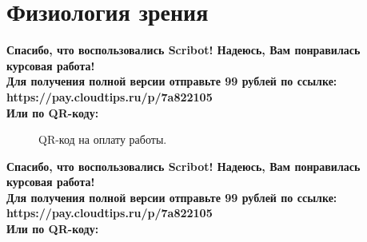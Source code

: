 \documentclass{article}
\begin{document}
\section{Физиология зрения}
\begin{center}
    \textbf{
        Спасибо, что воспользовались Scribot! Надеюсь, Вам понравилась курсовая работа!\\
        Для получения полной версии отправьте 99 рублей по ссылке:\\
        https://pay.cloudtips.ru/p/7a822105\\
        Или по QR-коду:\\
    }
\end{center}
\begin{figure}[h]
    \caption{QR-код на оплату работы.}
    \label{ris:image}
\end{figure}
\newpage
\begin{center}
    \textbf{
        Спасибо, что воспользовались Scribot! Надеюсь, Вам понравилась курсовая работа!\\
        Для получения полной версии отправьте 99 рублей по ссылке:\\
        https://pay.cloudtips.ru/p/7a822105\\
        Или по QR-коду:\\
    }
\end{center}
\end{document}
